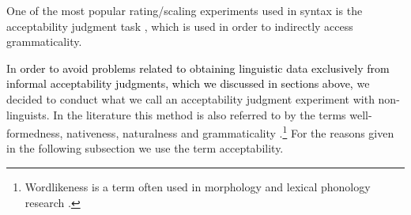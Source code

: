  One of the most popular rating/scaling experiments used in syntax is the acceptability judgment task \citep[cf.][244]{DAH09}, which is used in order to indirectly access grammaticality.  

In \textcolor{black}{order to avoid problems related to obtaining linguistic data exclusively from informal acceptability judgments, which we discussed in sections above,} we decided to conduct what we call an acceptability judgment experiment with non-linguists. In the literature this method is also referred to by the terms well-formedness, nativeness, naturalness and grammaticality \citep[cf.][2]{Myers17}.\footnote{Wordlikeness is a term often used in morphology and lexical phonology research \citep[2]{Myers17}.} For the reasons given in the following subsection we use the term acceptability. 

